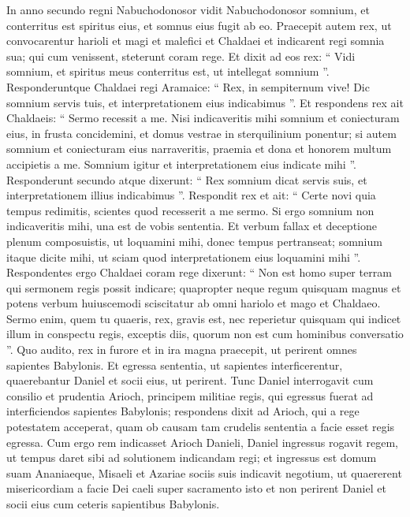 \begin{biblechapter}
\begin{biblechapter}
\verse In anno secundo regni Nabuchodonosor vidit Nabuchodonosor somnium, et conterritus est spiritus eius, et somnus eius fugit ab eo. 
\verse Praecepit autem rex, ut convocarentur harioli et magi et malefici et Chaldaei et indicarent regi somnia sua; qui cum venissent, steterunt coram rege. 
\verse Et dixit ad eos rex: “ Vidi somnium, et spiritus meus conterritus est, ut intellegat somnium ”. 
\verse Responderuntque Chaldaei regi Aramaice: “ Rex, in sempiternum vive! Dic somnium servis tuis, et interpretationem eius indicabimus ”. 
\verse Et respondens rex ait Chaldaeis: “ Sermo recessit a me. Nisi indicaveritis mihi somnium et coniecturam eius, in frusta concidemini, et domus vestrae in sterquilinium ponentur; 
\verse si autem somnium et coniecturam eius narraveritis, praemia et dona et honorem multum accipietis a me. Somnium igitur et interpretationem eius indicate mihi ”. 
 \verse Responderunt secundo atque dixerunt: “ Rex somnium dicat servis suis, et interpretationem illius indicabimus ”. 
\verse Respondit rex et ait: “ Certe novi quia tempus redimitis, scientes quod recesserit a me sermo. 
\verse Si ergo somnium non indicaveritis mihi, una est de vobis sententia. Et verbum fallax et deceptione plenum composuistis, ut loquamini mihi, donec tempus pertranseat; somnium itaque dicite mihi, ut sciam quod interpretationem eius loquamini mihi ”. 
\verse Respondentes ergo Chaldaei coram rege dixerunt: “ Non est homo super terram qui sermonem regis possit indicare; quapropter neque regum quisquam magnus et potens verbum huiuscemodi sciscitatur ab omni hariolo et mago et Chaldaeo. 
\verse Sermo enim, quem tu quaeris, rex, gravis est, nec reperietur quisquam qui indicet illum in conspectu regis, exceptis diis, quorum non est cum hominibus conversatio ”. 
\verse Quo audito, rex in furore et in ira magna praecepit, ut perirent omnes sapientes Babylonis.
 \verse Et egressa sententia, ut sapientes interficerentur, quaerebantur Daniel et socii eius, ut perirent.
 \verse Tunc Daniel interrogavit cum consilio et prudentia Arioch, principem militiae regis, qui egressus fuerat ad interficiendos sapientes Babylonis; 
\verse respondens dixit ad Arioch, qui a rege potestatem acceperat, quam ob causam tam crudelis sententia a facie esset regis egressa. Cum ergo rem indicasset Arioch Danieli, 
\verse Daniel ingressus rogavit regem, ut tempus daret sibi ad solutionem indicandam regi; 
\verse et ingressus est domum suam Ananiaeque, Misaeli et Azariae sociis suis indicavit negotium, 
\verse ut quaererent misericordiam a facie Dei caeli super sacramento isto et non perirent Daniel et socii eius cum ceteris sapientibus Babylonis. 

\end{biblechapter}
\end{biblechapter}
